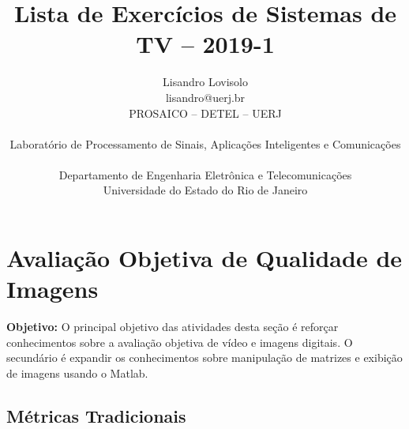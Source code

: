 \documentclass[11pt]{article}
\begin{document}
 

\title{Lista de Exercícios de Sistemas de TV -- 2019-1}
\author{Lisandro Lovisolo \\ lisandro@uerj.br \\ PROSAICO -- DETEL -- UERJ \\ \begin{small} Laboratório de Processamento de Sinais, Aplicações Inteligentes e Comunicações \end{small} \\ Departamento de Engenharia Eletrônica e Telecomunicações \\ Universidade do Estado do Rio de Janeiro}

\maketitle

\section{Avaliação Objetiva de Qualidade de Imagens}

\textbf{Objetivo:} O principal objetivo das atividades desta seção é reforçar conhecimentos sobre a avaliação objetiva de vídeo e imagens digitais. O secundário é expandir os conhecimentos sobre manipulação de matrizes e exibição de imagens usando o \textsf{Matlab}.

\subsection{Métricas Tradicionais}
\end{document}
